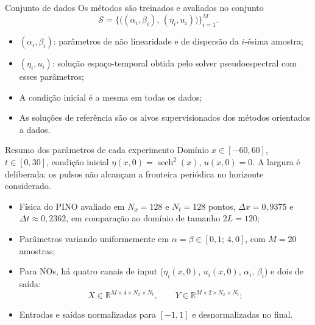 \begin{frame}{Conjunto de dados}
  Os métodos são treinados e avaliados no conjunto
  \begin{equation*}
    \mathcal{S} = \bigl\{\bigl((\alpha_i,\beta_i),\,(\eta_i,u_i)\bigr)\bigr\}_{i=1}^{M}.
  \end{equation*}
  \begin{itemize}[<+->]
    \item $(\alpha_i,\beta_i)$: parâmetros de não linearidade e de dispersão da
          $i$-ésima amostra;
    \item $(\eta_i,u_i)$: solução espaço-temporal obtida pelo solver pseudoespectral
          com esses parâmetros;
    \item A condição inicial é a mesma em todas os dados;
    \item As soluções de referência são os alvos supervisionados dos métodos
          orientados a dados.
  \end{itemize}
\end{frame}

\begin{frame}{Resumo dos parâmetros de cada experimento}
  Domínio $x \in [-60, 60]$, $t \in [0, 30]$, condição inicial
  $\eta(x,0) = \operatorname{sech}^2(x)$, $u(x,0) = 0$. A largura é deliberada: os
  pulsos não alcançam a fronteira periódica no horizonte considerado.
  \begin{itemize}[<+->]
    \item Física do PINO avaliado em $N_x = 128$ e $N_t = 128$ pontos,
          $\Delta x = 0{,}9375$ e $\Delta t \approx 0{,}2362$, em comparação ao domínio de tamanho $2L = 120$;
    \item Parâmetros variando uniformemente em $\alpha = \beta \in [0{,}1;\, 4{,}0]$, com $M = 20$ amostras;
    \item Para NOs, há quatro canais de input ($\eta_i(x,0)$, $u_i(x,0)$, $\alpha_i$,
          $\beta_i$) e dois de saída:
          \[
            X \in \mathbb{R}^{M \times 4 \times N_x \times N_t},
            \qquad
            Y \in \mathbb{R}^{M \times 2 \times N_x \times N_t};
          \]
    \item Entradas e saídas normalizadas para $[-1,1]$ e desnormalizadas no final.
  \end{itemize}
\end{frame}

